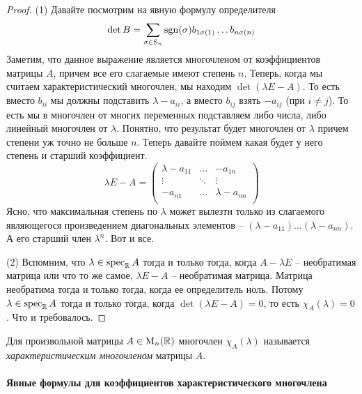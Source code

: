 \begin{proof}
(1) Давайте посмотрим на явную формулу определителя
\[
\det B = \sum_{\sigma\in\operatorname{S}_{n}}\operatorname{sgn}(\sigma) b_{1\sigma(1)}\ldots b_{n\sigma(n)}
\]
Заметим, что данное выражение является многочленом от коэффициентов матрицы $A$, причем все его слагаемые имеют степень $n$.
Теперь, когда мы считаем характеристический многочлен, мы находим $\det(\lambda E - A)$.
То есть вместо $b_{ii}$ мы должны подставить  $\lambda - a_{ii}$, а вместо $b_{ij}$ взять $-a_{ij}$ (при $i\neq j$).
То есть мы в многочлен от многих переменных подставляем либо числа, либо линейный многочлен от $\lambda$.
Понятно, что результат будет многочлен от $\lambda$ причем степени уж точно не больше $n$.
Теперь давайте поймем какая будет у него степень и старший коэффициент.
\[
\lambda E - A = 
\begin{pmatrix}
{\lambda - a_{11}}&{\ldots}&{-a_{1n}}\\
{\vdots}&{\ddots}&{\vdots}\\
{-a_{n1}}&{\ldots}&{\lambda - a_{nn}}\\
\end{pmatrix}
\]
Ясно, что максимальная степень по $\lambda$ может вылезти только из слагаемого являющегося произведением диагональных элементов -- $(\lambda - a_{11}) \ldots (\lambda - a_{nn})$.
А его старший член $\lambda^n$.
Вот и все.

(2) Вспомним, что $\lambda\in\operatorname{spec}_\mathbb R A$ тогда и только тогда, когда $A - \lambda E$ -- необратимая матрица или что то же самое,  $\lambda E - A$ -- необратимая матрица.
Матрица необратима тогда и только тогда, когда ее определитель ноль.
Потому $\lambda \in\operatorname{spec}_\mathbb R A$ тогда и только тогда, когда $\det (\lambda E - A) = 0$, то есть $\chi_A(\lambda) = 0$.
Что и требовалось.
\end{proof}

Для произвольной матрицы $A\in\operatorname{M}_{n}(\mathbb R)$ многочлен $\chi_A(\lambda)$ называется {\it характеристическим многочленом} матрицы $A$.

\paragraph{Явные формулы для коэффициентов характеристического многочлена}

